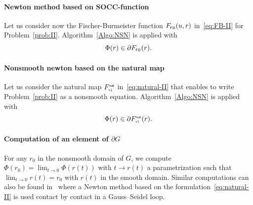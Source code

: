 \paragraph{Newton method based on  SOCC-function}
\label{Sec:Num-SOCCP}
Let us consider now the Fischer-Burmeister function $F_{{\hbox{\tiny{\textsf FB}}}}(u,r)$ in~\eqref{eq:FB-II} for Problem~\ref{prob:II}.
Algorithm~\ref{Algo:NSN} is applied {with}
\begin{equation}  \label{eq:phiphi-soccp}
    \Phi(r) \in \partial F_{\fb}(r).
\end{equation}

\paragraph{Nonsmooth newton based on the natural map }
Let us consider the natural map $F_{{\hbox{\tiny{vi}}}}^{\hbox{\sf \tiny{nat}}}$ in~\eqref{eq:natural-II} that enables to write Problem~\ref{prob:II} {as} a nonsmooth equation.
Algorithm~\ref{Algo:NSN} is applied {with}
\begin{equation}  \label{eq:phiphi}
    \Phi(r) \in \partial F_{\vitwo}^\nat(r).
\end{equation}

\paragraph{Computation of an element of $\partial G$}

For any $r_0$ in the nonsmooth domain of $G$, we compute $\Phi(r_0) = \lim_{t\to0}\Phi(r(t))$ with $t \to r(t)$ a parametrization such that $\lim_{t\to0}r(t) = r_0$ with $r(t)$ in the smooth domain. 
Similar computations can also be found in~\cite{Joli.Feng2008} where a Newton method based on the formulation~\eqref{eq:natural-II} is used contact by contact in a Gauss--Seidel loop.





